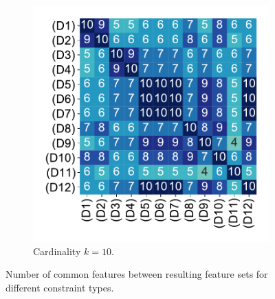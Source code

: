 \begin{figure}[t]
\begin{subfigure}{0.48\textwidth}
		\includegraphics[width=\textwidth, trim=15 15 15 15, clip]{plots/ms-selected-similarity-card10.pdf}
		\caption{Cardinality $k=10$.}
		\label{fig:ms:selected-similarity-card10}
	\end{subfigure}
	\caption{Number of common features between resulting feature sets for different constraint types.}
	\label{fig:ms:selected-similarity}
\end{figure}

